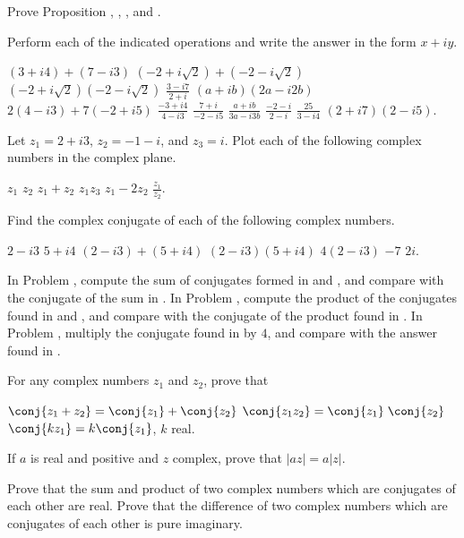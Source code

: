 \begin{exercises}

Prove Proposition , ,
, and .

Perform each of the indicated operations and write
the answer in the form $x + iy$.
\begin{exenum}
\x
$(3+i4)+(7-i3)$
\x
$(-2+i\sqrt2)+(-2-i\sqrt2)$
\x
$(-2+i\sqrt2)(-2-i\sqrt2)$
\x
$\frac{3-i7}{2+i}$
\x
$(a+ib)(2a-i2b)$
\x
$2(4-i3)+7(-2+i5)$
\x
$\frac{-3+i4}{4-i3}$
\x
$\frac{7+i}{-2-i5}$
\x
$\frac{a+ib}{3a-i3b}$
\x
$\frac{-2-i}{2-i}$
\x
$\frac{25}{3-i4}$
\x
$(2+i7)(2-i5)$.
\end{exenum}

Let $z_1=2+i3$, $z_2=-1-i$, and $z_3=i$.
Plot each of the following complex numbers
in the complex plane.
\begin{exenum}
\x
$z_1$
\x
$z_2$
\x
$z_1+z_2$
\x
$z_1z_3$
\x
$z_1-2z_2$
\x
$\frac{z_1}{z_2}$.
\end{exenum}

Find the complex conjugate of each of the following
complex numbers.
\begin{exenum}
\x
{}
$2-i3$
\x
{}
$5+i4$
\x
{}
$(2-i3)+(5+i4)$
\x
{}
$(2-i3)(5+i4)$
\x
{}
$4(2-i3)$
\x
$-7$
\x
$2i$.
\end{exenum}

\begin{exenum}
\x
In Problem ,
compute the sum of conjugates formed in
 and ,
and compare with the conjugate of the
sum in .
\x
In Problem ,
compute the product of the conjugates found in
 and ,
and compare with the conjugate of the product
found in .
\x
In Problem ,
multiply the conjugate found in 
by $4$, and compare with the answer
found in .
\end{exenum}

For any complex numbers $z_1$ and $z_2$,
prove that
\begin{exenum}
\x
$\conj{z_1+z_2} = \conj{z_1} + \conj{z_2}$
\x
$\conj{z_1z_2} = \conj{z_1}\;\conj{z_2}$
\x
$\conj{kz_1} = k\conj{z_1}$, $k$ real.
\end{exenum}

If $a$ is real and positive and $z$ complex,
prove that $|az| = a|z|$.

\begin{exenum}
\x
Prove that the sum and product of two complex
numbers which are conjugates of each other
are real.
\x
Prove that the difference of two complex
numbers which are conjugates of each other
is pure imaginary.
\end{exenum}


\end{exercises}
